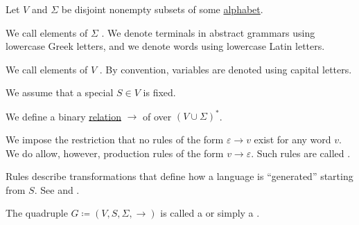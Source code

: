 \begin{definition}\label{def:formal_grammar}
  Let \( V \) and \( \Sigma \) be disjoint nonempty subsets of some \hyperref[def:formal_language/alphabet]{alphabet}.

  \begin{thmenum}
     We call elements of \( \Sigma \) . We denote terminals in abstract grammars using lowercase Greek letters, and we denote words using lowercase Latin letters.

     We call elements of \( V \) . By convention, variables are denoted using capital letters.

     We assume that a special  \( S \in V \) is fixed.

     We define a binary \hyperref[def:relation]{relation} \( \to \) of  over \( (V \cup \Sigma)^* \).

    We impose the restriction that no rules of the form \( \varepsilon \to v \) exist for any word \( v \). We do allow, however, production rules of the form \( v \to \varepsilon \). Such rules are called .

    Rules describe transformations that define how a language is \enquote{generated} starting from \( S \). See  and .

     The quadruple \( G \coloneqq (V, S, \Sigma, \to) \) is called a  or simply a .
  \end{thmenum}
\end{definition}

